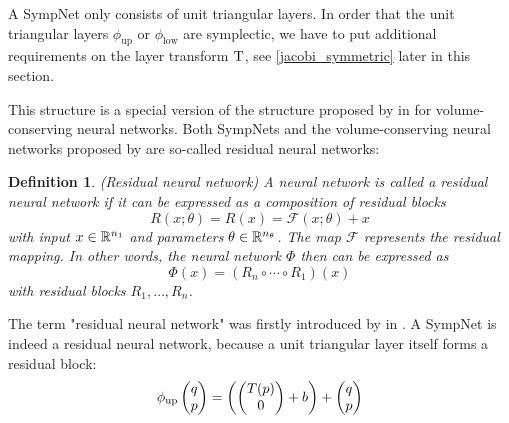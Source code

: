 \documentclass[twoside,a4paper]{article}
\newtheorem{definition}{Definition}
\begin{document}
A SympNet only consists of unit triangular layers. In order that the unit triangular layers 
$\phi_{\text{up}}$ or $\phi_{\text{low}}$ are symplectic,
we have to put additional requirements on the layer transform $\mathrm{T}$, see
\cref{jacobi_symmetric} later in this section.

This structure is a special version
of the structure proposed by \citeauthor{Deco1995} in \cite{Deco1995} 
for volume-conserving neural networks. Both SympNets and the volume-conserving neural
networks proposed by \citeauthor{Deco1995} are so-called residual neural networks:

\begin{definition}
	(Residual neural network)
	A neural network is called a residual neural network
	if it can be expressed as a composition of residual blocks
	\begin{equation*}
		R(x; \theta) = R(x) = \mathcal{F}(x; \theta) + x
	\end{equation*}
	with input $x \in \mathbb{R}^{n_1}$ and parameters $\theta \in \mathbb{R}^{n_\theta}$. 
	The map $\mathcal{F}$ represents the residual mapping.
	In other words, the neural network $\Phi$ then can be expressed as
	\begin{equation*}
		\Phi(x) = (R_n \circ \cdots \circ R_1)(x)
	\end{equation*}
	with residual blocks $R_1, \dots, R_n$.
\end{definition}

The term "residual neural network" was firstly introduced by \citeauthor{resnet2016} in
\cite{resnet2016}. A SympNet is indeed a residual neural network, because a
unit triangular layer itself forms a residual block:
\begin{equation*}
	\phi_{\text{up}} \begin{pmatrix} q \\ p \end{pmatrix} = \left( \begin{pmatrix}
		T(p) \\
		0
	\end{pmatrix} + b \right) + \begin{pmatrix} q \\ p \end{pmatrix}
\end{equation*}
\end{document}
